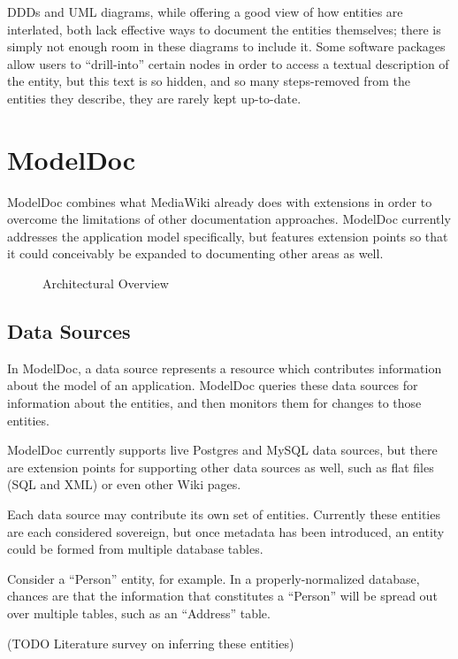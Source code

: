 \documentclass[twocolumn]{article}
\begin{document}
DDDs and UML diagrams, while offering a good view of how entities are
interlated, both lack effective ways to document the entities themselves; there
is simply not enough room in these diagrams to include it.  Some software
packages allow users to ``drill-into'' certain nodes in order to access a
textual description of the entity, but this text is so hidden, and so many
steps-removed from the entities they describe, they are rarely kept up-to-date.

\section{ModelDoc}

ModelDoc combines what MediaWiki already does with extensions in order to
overcome the limitations of other documentation approaches.  ModelDoc currently
addresses the application model specifically, but features extension points so
that it could conceivably be expanded to documenting other areas as well.

\begin{figure}
\centering
{}
\caption{Architectural Overview}
\end{figure}

\subsection{Data Sources}

In ModelDoc, a data source represents a resource which contributes information
about the model of an application.  ModelDoc queries these data sources for
information about the entities, and then monitors them for changes to those
entities.

ModelDoc currently supports live Postgres and MySQL data sources, but there are
extension points for supporting other data sources as well, such as flat files
(SQL and XML) or even other Wiki pages.

Each data source may contribute its own set of entities.  Currently these
entities are each considered sovereign, but once metadata has been introduced,
an entity could be formed from multiple database tables.

Consider a ``Person'' entity, for example.  In a properly-normalized database,
chances are that the information that constitutes a ``Person'' will be spread
out over multiple tables, such as an ``Address'' table.

(TODO Literature survey on inferring these entities)
\end{document}
